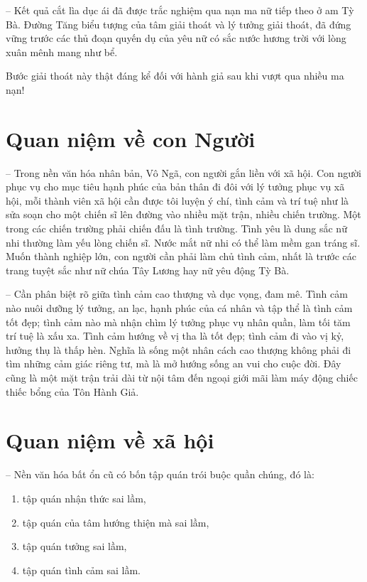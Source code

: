 -- Kết quả cắt lìa dục ái đã được trắc nghiệm qua nạn ma nữ tiếp theo ở am Tỳ Bà. Đường Tăng biểu tượng của tâm giải thoát và lý tưởng giải thoát, đã đứng vững trước các thủ đoạn quyến dụ của yêu nữ có sắc nước hương trời với lòng xuân mênh mang như bể.

Bước giải thoát này thật đáng kể đối với hành giả sau khi vượt qua nhiều ma nạn!

\section{Quan niệm về con Người} %
\label{sec:53_54_con_nguoi}

-- Trong nền văn hóa nhân bản, Vô Ngã, con người gắn liền với xã hội. Con người phục vụ cho mục tiêu hạnh phúc của bản thân đi đôi với lý tưởng phục vụ xã hội, mỗi thành viên xã hội cần được tôi luyện ý chí, tình cảm và trí tuệ như là sửa soạn cho một chiến sĩ lên đường vào nhiều mặt trận, nhiều chiến trường. Một trong các chiến trường phải chiến đấu là tình trường. Tình yêu là dung sắc nữ nhi thường làm yếu lòng chiến sĩ. Nước mắt nữ nhi có thể làm mềm gan tráng sĩ. Muốn thành nghiệp lớn, con người cần phải làm chủ tình cảm, nhất là trước các trang tuyệt sắc như nữ chúa Tây Lương hay nữ yêu động Tỳ Bà.

-- Cần phân biệt rõ giữa tình cảm cao thượng và dục vọng, đam mê. Tình cảm nào nuôi dưỡng lý tưởng, an lạc, hạnh phúc của cá nhân và tập thể là tình cảm tốt đẹp; tình cảm nào mà nhận chìm lý tưởng phục vụ nhân quần, làm tối tăm trí tuệ là xấu xa. Tình cảm hướng về vị tha là tốt đẹp; tình cảm đi vào vị kỷ, hưởng thụ là thấp hèn. Nghĩa là sống một nhân cách cao thượng không phải đi tìm những cảm giác riêng tư, mà là mở hướng sống an vui cho cuộc đời. Đây cũng là một mặt trận trải dài từ nội tâm đến ngoại giới mãi làm máy động chiếc thiếc bổng của Tôn Hành Giả.

\section{Quan niệm về xã hội} %
\label{sec:53_54_xa_hoi}

-- Nền văn hóa bất ổn cũ có bốn tập quán trói buộc quần chúng, đó là:

\begin{enumerate}[label=\itshape\arabic*\upshape/]
    \item tập quán nhận thức sai lầm,

    \item tập quán của tâm hướng thiện mà sai lầm,

    \item tập quán tưởng sai lầm,

    \item tập quán tình cảm sai lầm.
\end{enumerate}

